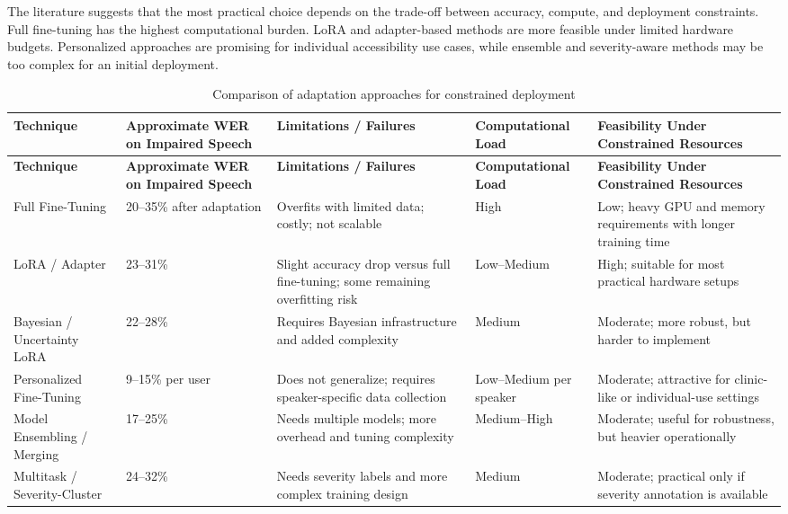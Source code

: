 \documentclass{article}
\begin{document}
The literature suggests that the most practical choice depends on the trade-off between accuracy, compute, and deployment constraints. Full fine-tuning has the highest computational burden. LoRA and adapter-based methods are more feasible under limited hardware budgets. Personalized approaches are promising for individual accessibility use cases, while ensemble and severity-aware methods may be too complex for an initial deployment.

\begin{longtable}{p{3.0cm} p{2.7cm} p{3.2cm} p{2.4cm} p{3.0cm}}
\caption{Comparison of adaptation approaches for constrained deployment} \\
\toprule
\textbf{Technique} & \textbf{Approximate WER on Impaired Speech} & \textbf{Limitations / Failures} & \textbf{Computational Load} & \textbf{Feasibility Under Constrained Resources} \\
\midrule
\endfirsthead
\toprule
\textbf{Technique} & \textbf{Approximate WER on Impaired Speech} & \textbf{Limitations / Failures} & \textbf{Computational Load} & \textbf{Feasibility Under Constrained Resources} \\
\midrule
\endhead
Full Fine-Tuning & 20--35\% after adaptation & Overfits with limited data; costly; not scalable & High & Low; heavy GPU and memory requirements with longer training time \\
LoRA / Adapter & 23--31\% & Slight accuracy drop versus full fine-tuning; some remaining overfitting risk & Low--Medium & High; suitable for most practical hardware setups \\
Bayesian / Uncertainty LoRA & 22--28\% & Requires Bayesian infrastructure and added complexity & Medium & Moderate; more robust, but harder to implement \\
Personalized Fine-Tuning & 9--15\% per user & Does not generalize; requires speaker-specific data collection & Low--Medium per speaker & Moderate; attractive for clinic-like or individual-use settings \\
Model Ensembling / Merging & 17--25\% & Needs multiple models; more overhead and tuning complexity & Medium--High & Moderate; useful for robustness, but heavier operationally \\
Multitask / Severity-Cluster & 24--32\% & Needs severity labels and more complex training design & Medium & Moderate; practical only if severity annotation is available \\
\bottomrule
\end{longtable}
\end{document}
